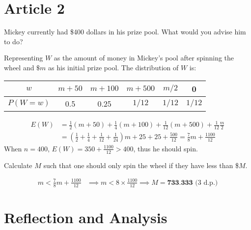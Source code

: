\documentclass[12pt]{exam}
\begin{document}
\section{Article 2}
\begin{questions}
\question Mickey currently had \$400 dollars in his prize pool. What would you advise him to do?
\begin{tcolorbox}
Representing $W$ as the amount of money in Mickey's pool after spinning the wheel and $\$m$ as his initial prize pool. The distribution of $W$ is:
\vspace{-0.2cm}
\begin{table}[H]
    \centering
    \begin{tabular}{|c|c|c|c|c|c|}
        \hline $w$ & $m + 50$ & $m+100$ & $m+500$ & $m/2$ & 0  \\
        \hline $P(W=w)$ & 0.5 & 0.25 & $1/12$ & $1/12$& $1/12$ \\
        \hline
    \end{tabular}
\end{table}
\vspace{-1cm}
\begin{align*}
    E(W) &= \frac{1}{2}\left(m+50\right)+\frac{1}{4}\left(m+100\right)+\frac{1}{12}\left(m+500\right)+\frac{1}{12}\frac{m}{2} \\
    &= \left(\frac{1}{2}+\frac{1}{4}+\frac{1}{12}+\frac{1}{24}\right)m + 25 + 25 + \frac{500}{12} = \frac{7}{8} m + \frac{1100}{12}
\end{align*}
When $n = 400$, $E(W) = 350 + \frac{1100}{12} > 400$, thus he should spin.
\end{tcolorbox}
\question Calculate $M$ such that one should only spin the wheel if they have less than \$$M$.
\begin{tcolorbox}
\begin{align*}
    m < \frac{7}{8} m + \frac{1100}{12} &\implies m < 8 \times \frac{1100}{12} \implies M = \textbf{733.333}\text{ (3 d.p.)}
\end{align*}
\end{tcolorbox}
\end{questions}
\section{Reflection and Analysis}
\end{document}
